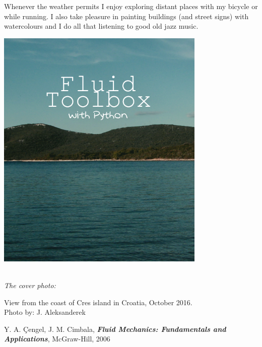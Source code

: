 \documentclass[10pt]{report}
\begin{document}
Whenever the weather permits I enjoy exploring distant places with my bicycle or while running. I also take pleasure in painting buildings (and street signs) with watercolours and I do all that listening to good old jazz music.

\begin{flushright}


\includegraphics[width = 100mm]{cover.png}

\setlength{\parskip}{0.1em}
\setlength{\parindent}{0cm}
\ \\[0.5cm]
\textit{The cover photo:}  

View from the coast of Cres island in Croatia, October 2016.
\ \\[0.1cm]
Photo by: J. Aleksanderek
\end{flushright}




\begin{thebibliography}{50}

\item Y. A. Çengel, J. M. Cimbala, \textbf{\textit{Fluid Mechanics: Fundamentals and Applications}}, McGraw-Hill, 2006
\item
\item
\item
\item
\item 

\item 
\item
\item
\item
\item
\item 

\item 
\item
\item
\item
\item
\item 
\thispagestyle{empty}
\end{thebibliography}
\end{document}
